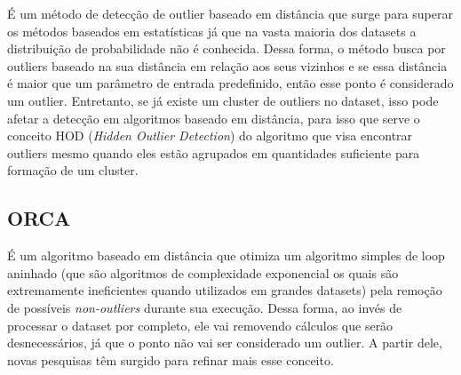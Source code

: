 
É um método de detecção de outlier baseado em distância \cite{Xu2016} que surge para superar os métodos baseados em estatísticas já que na vasta maioria dos datasets a distribuição de probabilidade não é conhecida. Dessa forma, o método busca por outliers baseado na sua distância em relação aos seus vizinhos e se essa distância é maior que um parâmetro de entrada predefinido, então esse ponto é considerado um outlier. Entretanto, se já existe um cluster de outliers no dataset, isso pode afetar a detecção em algoritmos baseado em distância, para isso que serve o conceito HOD (\textit{Hidden Outlier Detection}) do algoritmo que visa encontrar outliers mesmo quando eles estão agrupados em quantidades suficiente para formação de um cluster.

\subsection{ORCA}


É um algoritmo baseado em distância \cite{Bay:2003:MDO:956750.956758} que otimiza um algoritmo simples de loop aninhado 
(que são algoritmos de complexidade exponencial os quais são extremamente ineficientes quando utilizados em grandes datasets) pela remoção de possíveis \textit{non-outliers} durante sua execução. Dessa forma, ao invés de processar o dataset por completo, ele vai removendo cálculos que serão desnecessários, já que o ponto não vai ser considerado um outlier. A partir dele, novas pesquisas têm surgido para refinar mais esse conceito. 

